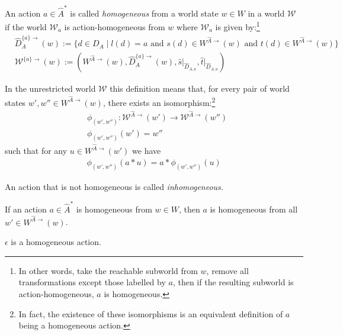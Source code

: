 \begin{definition}
    An action $a \in \hat{A}^{*}$ is called \emph{homogeneous} from a world state $w \in W$ in a world $\mathscr{W}$ if the world $\mathscr{W}_{a}$ is action-homogeneous from $w$ where $\mathscr{W}_{a}$ is given by:\footnote{
    In other words, take the reachable subworld from $w$, remove all transformations except those labelled by $a$, then if the resulting subworld is action-homogeneous, $a$ is homogeneous.
    }
    \begin{align}
        & \hat{D}_{A}^{\{a\}\to}(w) := \{ d \in D_{A} \mid l(d)=a \text{ and } s(d) \in W^{\hat{A}\to}(w) \text{ and } t(d) \in W^{\hat{A}\to}(w)\} \\
        & \mathscr{W}^{\{a\}\to}(w) := (W^{\hat{A}\to}(w), \hat{D}_{A}^{\{a\}\to}(w), \hat{s}\big|_{\hat{D}_{A, a}}, \hat{t}\big|_{\hat{D}_{A, a}})
    \end{align}
\end{definition}
In the unrestricted world $\mathscr{W}$ this definition means that, for every pair of world states $w', w'' \in W^{\hat{A}\to}(w)$, there exists an isomorphism:\footnote{
In fact, the existence of these isomorphisms is an equivalent definition of $a$ being a homogeneous action.
}
\begin{align}
    & \phi_{(w', w'')}: \mathscr{W}^{\hat{A}\to}(w') \to \mathscr{W}^{\hat{A}\to}(w'') \\
    & \phi_{(w', w'')}(w') = w''
\end{align}
such that for any $u \in W^{\hat{A}\to}(w')$ we have
\begin{align}
    \phi_{(w', w'')}(a \ast u) = a \ast \phi_{(w', w'')}(u)
\end{align}

An action that is not homogeneous is called \emph{inhomogeneous.}

\begin{corollary}
    If an action $a \in \hat{A}^{*}$ is homogeneous from $w \in W$, then $a$ is homogeneous from all $w' \in W^{\hat{A}\to}(w)$.
\end{corollary}

\begin{corollaryE}
    $\epsilon$ is a homogeneous action.
\end{corollaryE}
\begin{proofE}
\end{proofE}

